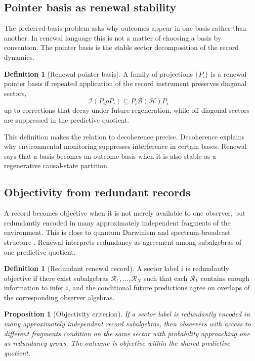 \documentclass[11pt]{article}
\numberwithin{equation}{section}
\newtheorem{proposition}[theorem]{Proposition}
\theoremstyle{definition}
\newtheorem{definition}[theorem]{Definition}
\theoremstyle{remark}
\newcommand{\Hilb}{\mathcal H}
\newcommand{\B}{\mathcal B}
\newcommand{\Ralg}{\mathcal R}
\newcommand{\Instr}{\mathcal I}
\begin{document}
\subsection{Pointer basis as renewal stability}

The preferred-basis problem asks why outcomes appear in one basis rather than another.  In renewal language this is not a matter of choosing a basis by convention.  The pointer basis is the stable sector decomposition of the record dynamics.

\begin{definition}[Renewal pointer basis]
A family of projections \(\{P_i\}\) is a renewal pointer basis if repeated application of the record instrument preserves diagonal sectors,
\begin{equation}
\label{eq:pointer-preservation}
  \Instr(P_i\rho P_i)\subseteq P_i\B(\Hilb)P_i
\end{equation}
up to corrections that decay under future regeneration, while off-diagonal sectors are suppressed in the predictive quotient.
\end{definition}

This definition makes the relation to decoherence precise.  Decoherence explains why environmental monitoring suppresses interference in certain bases.  Renewal says that a basis becomes an outcome basis when it is also stable as a regenerative causal-state partition.

\subsection{Objectivity from redundant records}

A record becomes objective when it is not merely available to one observer, but redundantly encoded in many approximately independent fragments of the environment.  This is close to quantum Darwinism and spectrum-broadcast structure \cite{Zurek2009,BrandaoPianiHorodecki2015}.  Renewal interprets redundancy as agreement among subalgebras of one predictive quotient.

\begin{definition}[Redundant renewal record]
A sector label \(i\) is redundantly objective if there exist subalgebras \(\Ralg_1,\ldots,\Ralg_N\) such that each \(\Ralg_k\) contains enough information to infer \(i\), and the conditional future predictions agree on overlaps of the corresponding observer algebras.
\end{definition}

\begin{proposition}[Objectivity criterion]
\label{prop:objectivity}
If a sector label is redundantly encoded in many approximately independent record subalgebras, then observers with access to different fragments condition on the same sector with probability approaching one as redundancy grows.  The outcome is objective within the shared predictive quotient.
\end{proposition}
\end{document}
